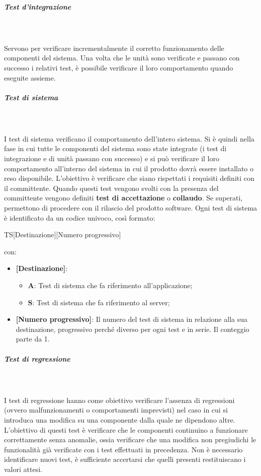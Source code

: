 \subparagraph{Test d’integrazione} \mbox{}\\ \\
Servono per verificare incrementalmente il corretto funzionamento delle componenti del sistema.
Una volta che le unità sono verificate e passano con successo i relativi test, è possibile verificare il loro comportamento quando eseguite assieme.

\subparagraph{Test di sistema} \mbox{}\\ \\
I test di sistema verificano il comportamento dell’intero sistema.
Si è quindi nella fase in cui tutte le componenti del sistema sono state integrate (i test di integrazione e di unità passano con successo) e si può verificare il loro comportamento all’interno del sistema in cui il prodotto dovrà essere installato o reso disponibile.
L'obiettivo è verificare che siano rispettati i requisiti definiti con il committente.
Quando questi test vengono svolti con la presenza del committente vengono definiti \textbf{test di accettazione} o \textbf{collaudo}. Se superati, permettono di procedere con il rilascio del prodotto software.
Ogni test di sistema è identificato da un codice univoco, così formato:
\begin{center}
    TS[Destinazione][Numero progressivo]
\end{center}
con:
\begin{itemize}
    \item \textbf{[Destinazione]}:
    \begin{itemize}
        \item \textbf{A}: Test di sistema che fa riferimento all'applicazione;
        \item \textbf{S}: Test di sistema che fa riferimento al server;
    \end{itemize}
    \item \textbf{[Numero progressivo]}: Il numero del test di sistema in relazione alla sua destinazione, progressivo perché diverso per ogni test e in serie. Il conteggio parte da 1.
\end{itemize}

\subparagraph{Test di regressione} \mbox{}\\ \\
I test di regressione hanno come obiettivo verificare l'assenza di regressioni (ovvero malfunzionamenti o comportamenti imprevisti) nel caso in cui si introduca una modifica su una componente dalla quale ne dipendono altre.
L'obiettivo di questi test è verificare che le componenti continuino a funzionare correttamente senza anomalie, ossia verificare che una modifica non pregiudichi le funzionalità già verificate con i test effettuati in precedenza.
Non è necessario identificare nuovi test, è sufficiente accertarsi che quelli presenti restituiscano i valori attesi.